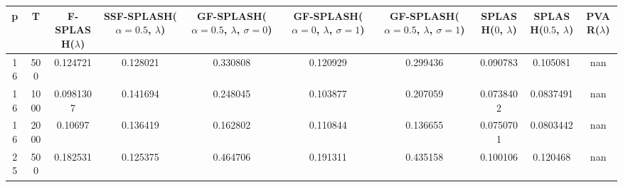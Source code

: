 \begin{tabular}{cccccccccc}
\hline
  p  &  T   &  F-SPLASH($\lambda$)  &  SSF-SPLASH($\alpha=0.5$, $\lambda$)  &  GF-SPLASH($\alpha=0.5$, $\lambda$, $\sigma=0$)  &  GF-SPLASH($\alpha=0$, $\lambda$, $\sigma=1$)  &  GF-SPLASH($\alpha=0.5$, $\lambda$, $\sigma=1$)  &  SPLASH($0$, $\lambda$)  &  SPLASH($0.5$, $\lambda$)  &  PVAR($\lambda$)  \\
\hline
 16  & 500  &       0.124721        &               0.128021                &                     0.330808                     &                    0.120929                    &                     0.299436                     &         0.090783         &          0.105081          &        nan        \\
 16  & 1000 &       0.0981307       &               0.141694                &                     0.248045                     &                    0.103877                    &                     0.207059                     &        0.0738402         &         0.0837491          &        nan        \\
 16  & 2000 &        0.10697        &               0.136419                &                     0.162802                     &                    0.110844                    &                     0.136655                     &        0.0750701         &         0.0803442          &        nan        \\
 25  & 500  &       0.182531        &               0.125375                &                     0.464706                     &                    0.191311                    &                     0.435158                     &         0.100106         &          0.120468          &        nan        \\
\hline
\end{tabular}